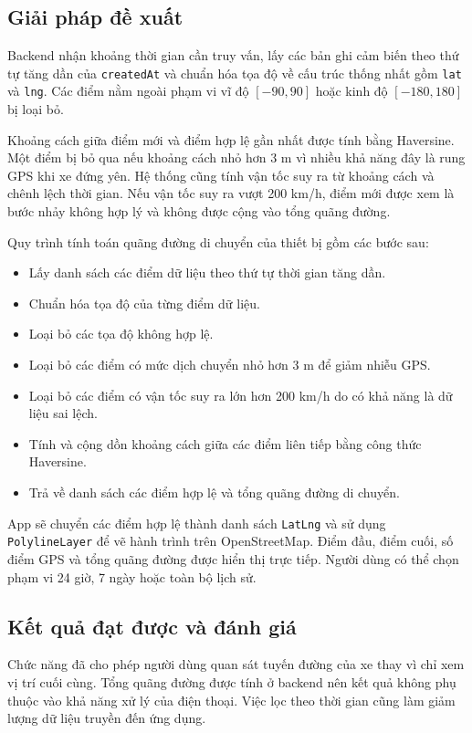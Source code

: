 \documentclass[../DoAn.tex]{subfiles}
\begin{document}
\subsection{Giải pháp đề xuất}

Backend nhận khoảng thời gian cần truy vấn, lấy các bản ghi cảm biến theo thứ tự
tăng dần của \texttt{createdAt} và chuẩn hóa tọa độ về cấu trúc thống nhất gồm
\texttt{lat} và \texttt{lng}. Các điểm nằm ngoài phạm vi vĩ độ $[-90,90]$ hoặc
kinh độ $[-180,180]$ bị loại bỏ.

Khoảng cách giữa điểm mới và điểm hợp lệ gần nhất được tính bằng Haversine. Một
điểm bị bỏ qua nếu khoảng cách nhỏ hơn 3 m vì nhiều khả năng đây là rung GPS khi
xe đứng yên. Hệ thống cũng tính vận tốc suy ra từ khoảng cách và chênh lệch thời
gian. Nếu vận tốc suy ra vượt 200 km/h, điểm mới được xem là bước nhảy không hợp
lý và không được cộng vào tổng quãng đường.

Quy trình tính toán quãng đường di chuyển của thiết bị gồm các bước sau:

\begin{itemize}
\item Lấy danh sách các điểm dữ liệu theo thứ tự thời gian tăng dần.
\item Chuẩn hóa tọa độ của từng điểm dữ liệu.
\item Loại bỏ các tọa độ không hợp lệ.
\item Loại bỏ các điểm có mức dịch chuyển nhỏ hơn 3 m để giảm nhiễu GPS.
\item Loại bỏ các điểm có vận tốc suy ra lớn hơn 200 km/h do có khả năng là dữ liệu sai lệch.
\item Tính và cộng dồn khoảng cách giữa các điểm liên tiếp bằng công thức Haversine.
\item Trả về danh sách các điểm hợp lệ và tổng quãng đường di chuyển.
\end{itemize}

App sẽ chuyển các điểm hợp lệ thành danh sách \texttt{LatLng} và sử dụng
\texttt{PolylineLayer} để vẽ hành trình trên OpenStreetMap. Điểm đầu, điểm cuối,
số điểm GPS và tổng quãng đường được hiển thị trực tiếp. Người dùng có thể chọn
phạm vi 24 giờ, 7 ngày hoặc toàn bộ lịch sử.

\subsection{Kết quả đạt được và đánh giá}

Chức năng đã cho phép người dùng quan sát tuyến đường của xe thay vì chỉ xem vị
trí cuối cùng. Tổng quãng đường được tính ở backend nên kết quả không phụ thuộc
vào khả năng xử lý của điện thoại. Việc lọc theo thời gian cũng làm giảm lượng
dữ liệu truyền đến ứng dụng.
\end{document}
